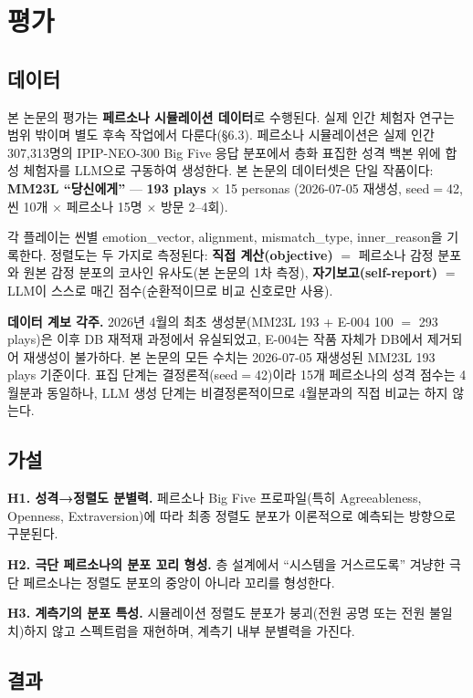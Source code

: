 \documentclass[11pt, a4paper]{article}
\begin{document}
\section{평가}

\subsection{데이터}
본 논문의 평가는 \textbf{페르소나 시뮬레이션 데이터}로 수행된다. 실제 인간 체험자 연구는 범위 밖이며 별도 후속 작업에서 다룬다(\S6.3). 페르소나 시뮬레이션은 실제 인간 307{,}313명의 IPIP-NEO-300 Big Five 응답 분포에서 층화 표집한 성격 백본 위에 합성 체험자를 LLM으로 구동하여 생성한다. 본 논문의 데이터셋은 단일 작품이다: \textbf{MM23L ``당신에게''} --- \textbf{193 plays} $\times$ 15 personas (2026-07-05 재생성, seed$=$42, 씬 10개 $\times$ 페르소나 15명 $\times$ 방문 2--4회).

각 플레이는 씬별 emotion\_vector, alignment, mismatch\_type, inner\_reason을 기록한다. 정렬도는 두 가지로 측정된다: \textbf{직접 계산(objective)} $=$ 페르소나 감정 분포와 원본 감정 분포의 코사인 유사도(본 논문의 1차 측정), \textbf{자기보고(self-report)} $=$ LLM이 스스로 매긴 점수(순환적이므로 비교 신호로만 사용).

\noindent\textbf{데이터 계보 각주.} 2026년 4월의 최초 생성분(MM23L 193 + E-004 100 $=$ 293 plays)은 이후 DB 재적재 과정에서 유실되었고, E-004는 작품 자체가 DB에서 제거되어 재생성이 불가하다. 본 논문의 모든 수치는 2026-07-05 재생성된 MM23L 193 plays 기준이다. 표집 단계는 결정론적(seed$=$42)이라 15개 페르소나의 성격 점수는 4월분과 동일하나, LLM 생성 단계는 비결정론적이므로 4월분과의 직접 비교는 하지 않는다.

\subsection{가설}
\textbf{H1. 성격→정렬도 분별력.} 페르소나 Big Five 프로파일(특히 Agreeableness, Openness, Extraversion)에 따라 최종 정렬도 분포가 이론적으로 예측되는 방향으로 구분된다.

\textbf{H2. 극단 페르소나의 분포 꼬리 형성.} 층 설계에서 ``시스템을 거스르도록'' 겨냥한 극단 페르소나는 정렬도 분포의 중앙이 아니라 꼬리를 형성한다.

\textbf{H3. 계측기의 분포 특성.} 시뮬레이션 정렬도 분포가 붕괴(전원 공명 또는 전원 불일치)하지 않고 스펙트럼을 재현하며, 계측기 내부 분별력을 가진다.

\subsection{결과}
\end{document}

